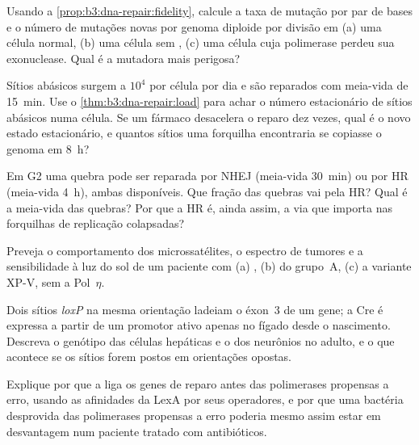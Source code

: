 \begin{exercise}[$\star\star$]\label{exo:b3:dna-repair:5}
Usando a \cref{prop:b3:dna-repair:fidelity}, calcule a taxa de mutação
por par de bases e o número de mutações novas por genoma diploide por
divisão em (a) uma célula normal, (b) uma célula sem , (c) uma célula cuja polimerase perdeu sua exonuclease.
Qual é a mutadora mais perigosa?
\end{exercise}

\begin{exercise}[$\star\star$]\label{exo:b3:dna-repair:6}
Sítios abásicos surgem a $10^{4}$ por célula por dia e são reparados
com meia-vida de \qty{15}{min}. Use o \cref{thm:b3:dna-repair:load}
para achar o número estacionário de sítios abásicos numa célula. Se um
fármaco desacelera o reparo dez vezes, qual é o novo estado
estacionário, e quantos sítios uma forquilha encontraria se copiasse o
genoma em \qty{8}{h}?
\end{exercise}

\begin{exercise}[$\star\star$]\label{exo:b3:dna-repair:7}
Em G2 uma quebra pode ser reparada por NHEJ (meia-vida \qty{30}{min})
ou por HR (meia-vida \qty{4}{h}), ambas disponíveis. Que fração das
quebras vai pela HR? Qual é a meia-vida das quebras? Por que a HR é,
ainda assim, a via que importa nas forquilhas de replicação colapsadas?
\end{exercise}

\begin{exercise}[$\star\star$]\label{exo:b3:dna-repair:8}
Preveja o comportamento dos microssatélites, o espectro de tumores e a
sensibilidade à luz do sol de um paciente com (a) ,
(b)  do grupo~A, (c) a variante XP-V, sem a
Pol~$\eta$.
\end{exercise}

\begin{exercise}[$\star\star$]\label{exo:b3:dna-repair:9}
Dois sítios \emph{loxP} na mesma orientação ladeiam o éxon~3 de um
gene; a Cre é expressa a partir de um promotor ativo apenas no fígado
desde o nascimento. Descreva o genótipo das células hepáticas e o dos
neurônios no adulto, e o que acontece se os sítios forem postos em
orientações opostas.
\end{exercise}

\begin{exercise}[$\star\star\star$]\label{exo:b3:dna-repair:10}
Explique por que a  liga os genes de reparo antes das
polimerases propensas a erro, usando as afinidades da LexA por seus
operadores, e por que uma bactéria desprovida das polimerases
propensas a erro poderia mesmo assim estar em desvantagem num paciente
tratado com antibióticos.
\end{exercise}

